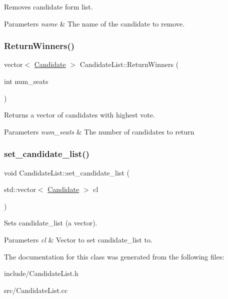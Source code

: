 Removes candidate form list. 


\begin{DoxyParams}{Parameters}
{\em name} & The name of the candidate to remove. \\
\hline
\end{DoxyParams}
\mbox{\label{class_candidate_list_abfdc825213700c4fe146dba1ec599d0d}} 
\subsubsection{\texorpdfstring{Return\+Winners()}{ReturnWinners()}}
{\footnotesize\ttfamily vector$<$ \mbox{\hyperlink{class_candidate}{Candidate}} $>$ Candidate\+List\+::\+Return\+Winners (\begin{DoxyParamCaption}\item[{int}]{num\+\_\+seats }\end{DoxyParamCaption})}



Returns a vector of candidates with highest vote. 


\begin{DoxyParams}{Parameters}
{\em num\+\_\+seats} & The number of candidates to return \\
\hline
\end{DoxyParams}
\mbox{\label{class_candidate_list_a541bbc8c8b05edadc46c72567a5c446a}} 
\subsubsection{\texorpdfstring{set\+\_\+candidate\+\_\+list()}{set\_candidate\_list()}}
{\footnotesize\ttfamily void Candidate\+List\+::set\+\_\+candidate\+\_\+list (\begin{DoxyParamCaption}\item[{std\+::vector$<$ \mbox{\hyperlink{class_candidate}{Candidate}} $>$}]{cl }\end{DoxyParamCaption})\hspace{0.3cm}{\ttfamily [inline]}}



Sets candidate\+\_\+list (a vector). 


\begin{DoxyParams}{Parameters}
{\em cl} & Vector to set candidate\+\_\+list to. \\
\hline
\end{DoxyParams}


The documentation for this class was generated from the following files\+:\begin{DoxyCompactItemize}
\item 
include/Candidate\+List.\+h\item 
src/Candidate\+List.\+cc\end{DoxyCompactItemize}
